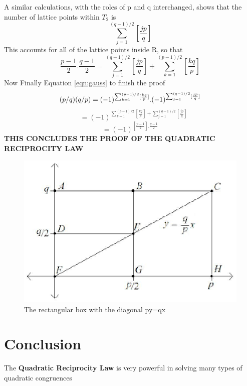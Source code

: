\documentclass[20pt,a4paper]{article}
\begin{document}
A similar calculations, with the roles of p and q interchanged, shows that the number of lattice points within $T_2$ is 
\[
\sum_{j=1}^{(q-1)/2} [\frac{jp}{q}]
\]
This accounts for all of the lattice points inside R, so that
\[
\frac{p-1}{2}.\frac{q-1}{2} = \sum_{j=1}^{(q-1)/2} [\frac{jp}{q}] + \sum_{k=1}^{(p-1)/2} [\frac{kq}{p}]
\]
Now Finally Equation  \ref{eqn:gauss} to finish the proof 
\[
(p/q)(q/p)=(-1)^{\sum_{k=1}^{(p-1)/2} [\frac{kq}{p}]} .(-1)^{\sum_{j=1}^{(q-1)/2} [\frac{jp}{q}]} \\
\]
\[
\quad =(-1)^{\sum_{k=1}^{(p-1)/2} [\frac{kq}{p}] + \sum_{j=1}^{(q-1)/2} [\frac{jp}{q}]}
\]
\[
=(-1)^{[\frac{p-1}{2}] . \frac{q-1}{2}}
\]
\textbf{THIS CONCLUDES THE PROOF OF THE QUADRATIC RECIPROCITY LAW}
\begin{figure}
    \centering
    \includegraphics[scale=0.7]{quadimg2.eps}
    \caption{The rectangular box with the diagonal py=qx}
    \label{fig:image}
\end{figure}
\section{Conclusion}
The \textbf{Quadratic Reciprocity Law} is very powerful in solving many types of quadratic congruences


\end{document}
